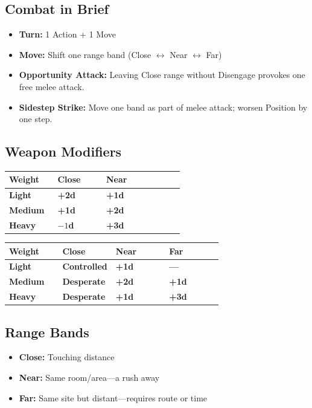 \documentclass[10pt,twocolumn]{article} %
\begin{document}
\subsection{Combat in Brief}
\begin{itemize}[leftmargin=*]
    \item \textbf{Turn:} 1 Action + 1 Move
    \item \textbf{Move:} Shift one range band (Close $\leftrightarrow$ Near $\leftrightarrow$ Far)
    \item \textbf{Opportunity Attack:} Leaving Close range without Disengage provokes one free melee attack.
    \item \textbf{Sidestep Strike:} Move one band as part of melee attack; worsen Position by one step.
\end{itemize}

\subsection{Weapon Modifiers}
\begin{coretable}
\begin{tabular}{>{\bfseries}p{0.25\linewidth} >{\bfseries}p{0.25\linewidth} >{\bfseries}p{0.4\linewidth}}
\toprule
\textbf{Weight} & \textbf{Close} & \textbf{Near} \\
\midrule
Light & +2d & +1d \\
Medium & +1d & +2d \\
Heavy & $-1$d & +3d \\
\bottomrule
\end{tabular}
\end{coretable}

\begin{coretable}
\begin{tabular}{>{\bfseries}p{0.25\linewidth} >{\bfseries}p{0.25\linewidth} >{\bfseries}p{0.25\linewidth} >{\bfseries}p{0.25\linewidth}}
\toprule
\textbf{Weight} & \textbf{Close} & \textbf{Near} & \textbf{Far} \\
\midrule
Light & Controlled & +1d & --- \\
Medium & Desperate & +2d & +1d \\
Heavy & Desperate & +1d & +3d \\
\bottomrule
\end{tabular}
\end{coretable}

\subsection{Range Bands}
\begin{itemize}[leftmargin=*]
    \item \textbf{Close:} Touching distance
    \item \textbf{Near:} Same room/area---a rush away
    \item \textbf{Far:} Same site but distant---requires route or time
\end{itemize}
\end{document}
